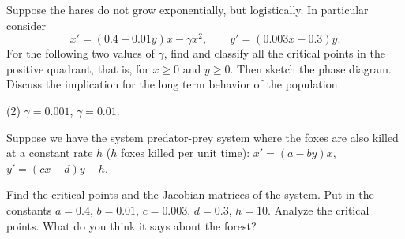 \documentclass{ximera}
\begin{document}
\begin{exercise}
    Suppose the hares do not grow exponentially, but logistically.  In particular consider
    \begin{equation*}
        x' = (0.4-0.01y)x - \gamma x^2, \qquad y' = (0.003x-0.3)y .
    \end{equation*}
    For the following two values of $\gamma$, find and classify all the critical points in the positive quadrant, that is, for $x \geq 0$ and $y \geq 0$.  Then sketch the phase diagram.  Discuss the implication for the long term behavior of the population.
    \begin{tasks}(2)
        \task $\gamma=0.001$, 
        \task $\gamma=0.01$.
    \end{tasks}
\end{exercise}

\begin{exercise}%
    Suppose we have the system predator-prey system where the foxes are also killed at a constant rate $h$ ($h$ foxes killed per unit time): $x' = (a-by)x,$  $y' = (cx-d)y - h$.
    \begin{tasks}
        \task Find the critical points and the Jacobian matrices of the system.
        \task Put in the constants $a=0.4$, $b=0.01$, $c=0.003$, $d=0.3$, $h=10$. Analyze the critical points.  What do you think it says about the forest?
    \end{tasks}
\end{exercise}
\end{document}
